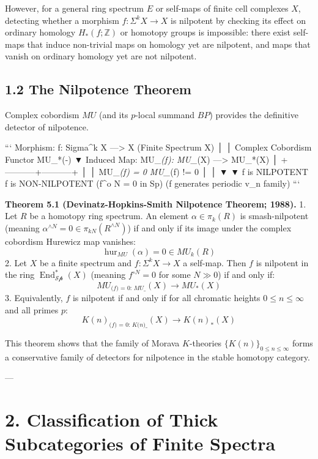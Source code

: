 \documentclass[11pt,twoside,openright]{amsbook}
\begin{document}
However, for a general ring spectrum $E$ or self-maps of finite cell complexes $X$, detecting whether a morphism $f: \Sigma^k X \to X$ is nilpotent by checking its effect on ordinary homology $H_*(f; \mathbb{Z})$ or homotopy groups is impossible: there exist self-maps that induce non-trivial maps on homology yet are nilpotent, and maps that vanish on ordinary homology yet are not nilpotent.

\subsection{1.2 The Nilpotence Theorem}
Complex cobordism $MU$ (and its $p$-local summand $BP$) provides the definitive detector of nilpotence.

```
       Morphism: f: Sigma^k X ---> X  (Finite Spectrum X)
                     │
                     │  Complex Cobordism Functor MU_*(-)
                     ▼
       Induced Map: MU_\textit{(f): MU_}(X) ---> MU_*(X)
                     │
         +-----------+-----------+
         │                       │
   MU_\textit{(f) = 0              MU_}(f) != 0
         │                       │
         ▼                       ▼
    f is NILPOTENT         f is NON-NILPOTENT
   (f^{o N} = 0 in Sp)    (f generates periodic v_n family)
```

\textbf{Theorem 5.1 (Devinatz-Hopkins-Smith Nilpotence Theorem; 1988).}
1. Let $R$ be a homotopy ring spectrum. An element $\alpha \in \pi_k(R)$ is smash-nilpotent (meaning $\alpha^{\wedge N} = 0 \in \pi_{k N}(R^{\wedge N})$) if and only if its image under the complex cobordism Hurewicz map vanishes:
   $$\operatorname{hur}_{MU}(\alpha) = 0 \in MU_k(R)$$
2. Let $X$ be a finite spectrum and $f: \Sigma^k X \to X$ a self-map. Then $f$ is nilpotent in the ring $\operatorname{End}_{\mathcal{Sp}}^*(X)$ (meaning $f^{\circ N} = 0$ for some $N \gg 0$) if and only if:
   $$MU_\textit{(f) = 0: MU_}(X) \longrightarrow MU_*(X)$$
3. Equivalently, $f$ is nilpotent if and only if for all chromatic heights $0 \leq n \leq \infty$ and all primes $p$:
   $$K(n)_\textit{(f) = 0: K(n)_}(X) \longrightarrow K(n)_*(X)$$

This theorem shows that the family of Morava $K$-theories $\{K(n)\}_{0 \leq n \leq \infty}$ forms a conservative family of detectors for nilpotence in the stable homotopy category.

---

\section{2. Classification of Thick Subcategories of Finite Spectra}
\end{document}
